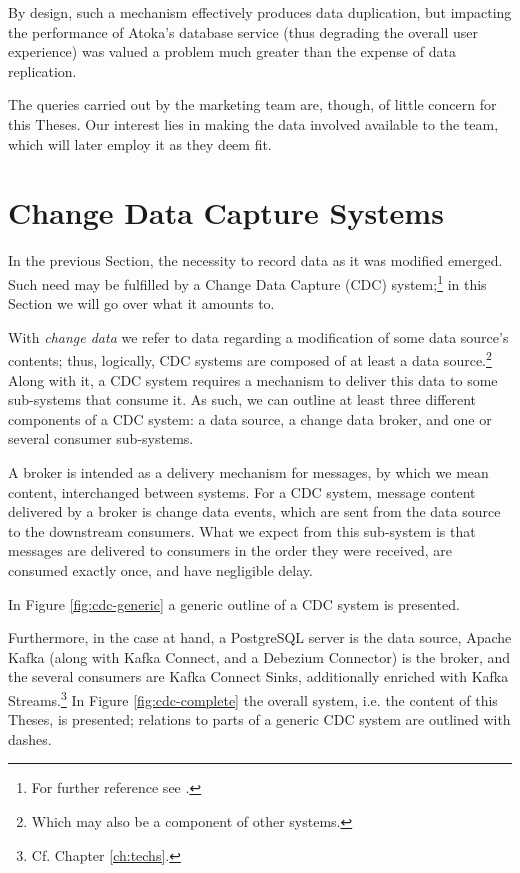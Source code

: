 By design, such a mechanism effectively produces data duplication, but impacting the performance of Atoka's database service (thus degrading the overall user experience) was valued a problem much greater than the expense of data replication.

The queries carried out by the marketing team are, though, of little concern for this Theses.
Our interest lies in making the data involved available to the team, which will later employ it as they deem fit.


\section{Change Data Capture Systems}
\label{sec:cdc}

In the previous Section, the necessity to record data as it was modified emerged.
Such need may be fulfilled by a Change Data Capture (CDC) system;\footnote{%
For further reference see \cite{cdc}.
} in this Section we will go over what it amounts to.

With \emph{change data} we refer to data regarding a modification of some data source's contents; thus, logically, CDC systems are composed of at least a data source.\footnote{%
Which may also be a component of other systems.}
Along with it, a CDC system requires a mechanism to deliver this data to some sub-systems that consume it.
As such, we can outline at least three different components of a CDC system: a data source, a change data broker, and one or several consumer sub-systems.

A broker is intended as a delivery mechanism for messages, by which we mean content, interchanged between systems.
For a CDC system, message content delivered by a broker is change data events, which are sent from the data source to the downstream consumers.
What we expect from this sub-system is that messages are delivered to consumers in the order they were received, are consumed exactly once, and have negligible delay.

In Figure \ref{fig:cdc-generic} a generic outline of a CDC system is presented.

Furthermore, in the case at hand, a PostgreSQL server is the data source, Apache Kafka (along with Kafka Connect, and a Debezium Connector) is the broker, and the several consumers are Kafka Connect Sinks, additionally enriched with Kafka Streams.\footnote{Cf. Chapter \ref{ch:techs}.}
In Figure \ref{fig:cdc-complete} the overall system, i.e. the content of this Theses, is presented; relations to parts of a generic CDC system are outlined with dashes.

